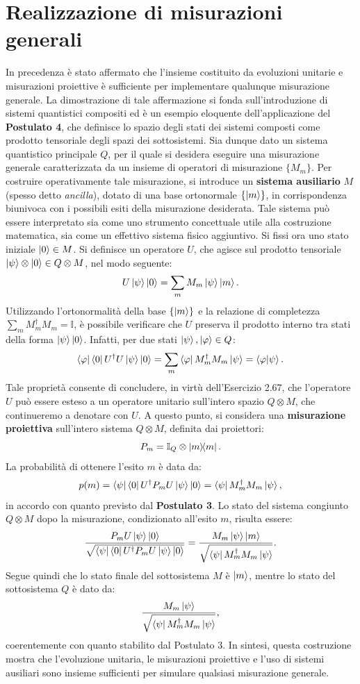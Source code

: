 \documentclass[a4paper,12pt]{report}
\theoremstyle{plain}
\begin{document}
\section*{Realizzazione di misurazioni generali}
In precedenza è stato affermato che l'insieme costituito da evoluzioni unitarie e misurazioni proiettive è sufficiente per implementare qualunque misurazione generale. La dimostrazione di tale affermazione si fonda sull'introduzione di sistemi quantistici compositi ed è un esempio eloquente dell’applicazione del \textbf{Postulato 4}, che definisce lo spazio degli stati dei sistemi composti come prodotto tensoriale degli spazi dei sottosistemi.
Sia dunque dato un sistema quantistico principale $Q$, per il quale si desidera eseguire una misurazione generale caratterizzata da un insieme di operatori di misurazione $\{M_m\}$. Per costruire operativamente tale misurazione, si introduce un \textbf{sistema ausiliario} $M$ (spesso detto \emph{ancilla}), dotato di una base ortonormale $\{\ket{m}\}$, in corrispondenza biunivoca con i possibili esiti della misurazione desiderata. Tale sistema può essere interpretato sia come uno strumento concettuale utile alla costruzione matematica, sia come un effettivo sistema fisico aggiuntivo.
Si fissi ora uno stato iniziale $\ket{0} \in M$. Si definisce un operatore $U$, che agisce sul prodotto tensoriale $\ket{\psi} \otimes \ket{0} \in Q \otimes M$, nel modo seguente:
\[
U\ket{\psi}\ket{0} = \sum_m M_m\ket{\psi}\ket{m}.
\]
Utilizzando l'ortonormalità della base $\{\ket{m}\}$ e la relazione di completezza $\sum_m M_m^\dagger M_m = \mathbb{I}$, è possibile verificare che $U$ preserva il prodotto interno tra stati della forma $\ket{\psi}\ket{0}$. Infatti, per due stati $\ket{\psi}, \ket{\varphi} \in Q$:
\[
\bra{\varphi}\bra{0} U^\dagger U \ket{\psi}\ket{0} = \sum_{m} \bra{\varphi}M_m^\dagger M_m\ket{\psi} = \braket{\varphi}{\psi}.
\]
Tale proprietà consente di concludere, in virtù dell'Esercizio 2.67, che l'operatore $U$ può essere esteso a un operatore unitario sull'intero spazio $Q \otimes M$, che continueremo a denotare con $U$.
A questo punto, si considera una \textbf{misurazione proiettiva} sull'intero sistema $Q \otimes M$, definita dai proiettori:
\[
P_m = \mathbb{I}_Q \otimes \dyad{m}.
\]
La probabilità di ottenere l'esito $m$ è data da:
\[
p(m) = \bra{\psi}\bra{0} U^\dagger P_m U \ket{\psi}\ket{0} = \bra{\psi}M_m^\dagger M_m\ket{\psi},
\]
in accordo con quanto previsto dal \textbf{Postulato 3}.
Lo stato del sistema congiunto $Q \otimes M$ dopo la misurazione, condizionato all'esito $m$, risulta essere:
\[
\frac{P_m U\ket{\psi}\ket{0}}{\sqrt{\bra{\psi}\bra{0} U^\dagger P_m U \ket{\psi}\ket{0}}} = \frac{M_m\ket{\psi}\ket{m}}{\sqrt{\bra{\psi}M_m^\dagger M_m\ket{\psi}}}.
\]
Segue quindi che lo stato finale del sottosistema $M$ è $\ket{m}$, mentre lo stato del sottosistema $Q$ è dato da:
\[
\frac{M_m\ket{\psi}}{\sqrt{\bra{\psi}M_m^\dagger M_m\ket{\psi}}},
\]
coerentemente con quanto stabilito dal Postulato 3.
In sintesi, questa costruzione mostra che l'evoluzione unitaria, le misurazioni proiettive e l'uso di sistemi ausiliari sono insieme sufficienti per simulare qualsiasi misurazione generale.
\end{document}
